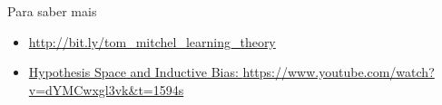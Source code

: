 \documentclass[10pt, professionalfonts]{beamer}
\begin{document}
\appendix

\begin{frame}[fragile]{Para saber mais}
  \begin{itemize}
    \item \href{http://bit.ly/tom_mitchel_learning_theory}{\url{http://bit.ly/tom_mitchel_learning_theory}}
    \item \href{https://www.youtube.com/watch?v=dYMCwxgl3vk&t=1594s}{Hypothesis Space and Inductive Bias: \url{https://www.youtube.com/watch?v=dYMCwxgl3vk&t=1594s}}
  \end{itemize}
\end{frame}
\end{document}
